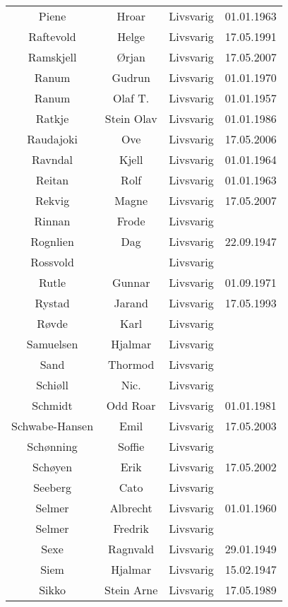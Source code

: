 \begin{tabular}{cccc}
        Piene	&	Hroar	&	Livsvarig 	&	01.01.1963	\\
        Raftevold	&	Helge	&	Livsvarig 	&	17.05.1991	\\
        Ramskjell	&	Ørjan	&	Livsvarig	&	17.05.2007	\\
        Ranum	&	Gudrun	&	Livsvarig 	&	01.01.1970	\\
        Ranum	&	Olaf T.	&	Livsvarig 	&	01.01.1957	\\
        Ratkje	&	Stein Olav	&	Livsvarig 	&	01.01.1986	\\
        Raudajoki	&	Ove	&	Livsvarig	&	17.05.2006	\\
        Ravndal	&	Kjell	&	Livsvarig 	&	01.01.1964	\\
        Reitan	&	Rolf	&	Livsvarig 	&	01.01.1963	\\
        Rekvig	&	Magne	&	Livsvarig	&	17.05.2007	\\
        Rinnan	&	Frode	&	Livsvarig 	&		\\
        Rognlien	&	Dag	&	Livsvarig 	&	22.09.1947	\\
        Rossvold	&		&	Livsvarig 	&		\\
        Rutle	&	Gunnar	&	Livsvarig 	&	01.09.1971	\\
        Rystad	&	Jarand	&	Livsvarig 	&	17.05.1993	\\
        Røvde	&	Karl	&	Livsvarig 	&		\\
        Samuelsen	&	Hjalmar	&	Livsvarig 	&		\\
        Sand	&	Thormod	&	Livsvarig 	&		\\
        Schiøll	&	Nic.	&	Livsvarig 	&		\\
        Schmidt	&	Odd Roar	&	Livsvarig 	&	01.01.1981	\\
        Schwabe-Hansen 	&	Emil	&	Livsvarig	&	17.05.2003	\\
        Schønning	&	Soffie	&	Livsvarig 	&		\\
        Schøyen 	&	Erik	&	Livsvarig	&	17.05.2002	\\
        Seeberg	&	Cato	&	Livsvarig 	&		\\
        Selmer	&	Albrecht	&	Livsvarig 	&	01.01.1960	\\
        Selmer	&	Fredrik	&	Livsvarig 	&		\\
        Sexe	&	Ragnvald	&	Livsvarig 	&	29.01.1949	\\
        Siem	&	Hjalmar	&	Livsvarig 	&	15.02.1947	\\
        Sikko	&	Stein Arne	&	Livsvarig 	&	17.05.1989	\\

\end{tabular}
